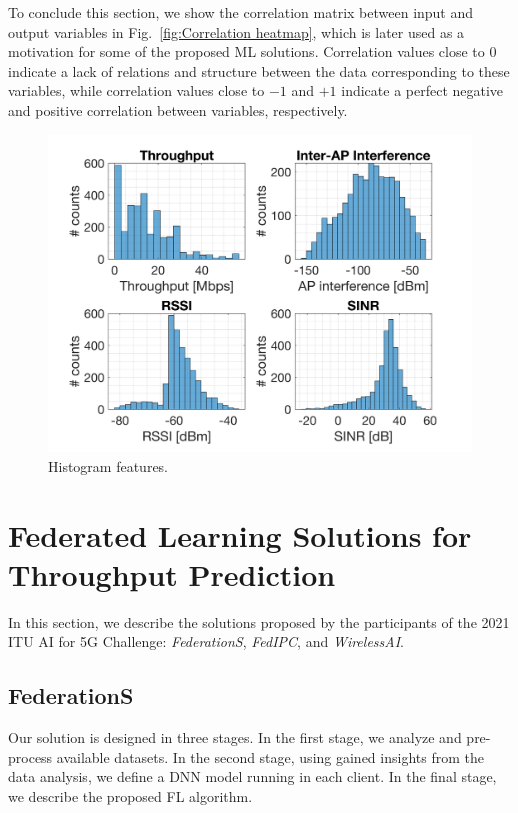 \documentclass[10pt,a4paper,twocolumn]{article}
\newcommand{\ITUpar}{\vspace{8pt}\par}
\def\startfigure{\vspace{6pt}\begin{figure}[ht]\center}
\begin{document}
To conclude this section, we show the correlation matrix between input and output variables in Fig.~\ref{fig:Correlation heatmap}, which is later used as a motivation for some of the proposed ML solutions. Correlation values close to $0$ indicate a lack of relations and structure between the data corresponding to these variables, while correlation values close to $-1$ and $+1$ indicate a perfect negative and positive correlation between variables, respectively.

\startfigure
\centering
\includegraphics[width=.85\columnwidth]{img/hist_features}
\caption{Histogram features.}
\label{fig:hist_features}
\end{figure} 

\section{Federated Learning Solutions for Throughput Prediction}
\label{section:solutions}

In this section, we describe the solutions proposed by the participants of the 2021 ITU AI for 5G Challenge: \textit{FederationS}, \textit{FedIPC}, and \textit{WirelessAI}.

\subsection{FederationS}


Our solution is designed in three stages. In the first stage, we analyze and pre-process available datasets. In the second stage, using gained insights from the data analysis, we define a DNN model running in each client. In the final stage, we describe the proposed FL algorithm. \ITUpar
\end{document}
